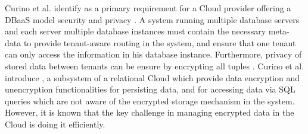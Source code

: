 Curino et al. identify as a primary requirement for a Cloud provider offering a \ac{DBaaS} model security and privacy \cite{relationalcloud2010}. A system running multiple database servers and each server multiple database instances must contain the necessary meta-data to provide tenant-aware routing in the system, and ensure that one tenant can only access the information in his database instance. Furthermore, privacy of stored data between tenants can be ensure by encrypting all tuples \cite{relationalcloud2}. Curino et al. introduce , a subsystem of a relational Cloud which provide data encryption and unencryption functionalities for persisting data, and for accessing data via \ac{SQL} queries which are not aware of the encrypted storage mechanism in the system. However, it is known that the key challenge in managing encrypted data in the Cloud is doing it efficiently.

\FloatBarrier